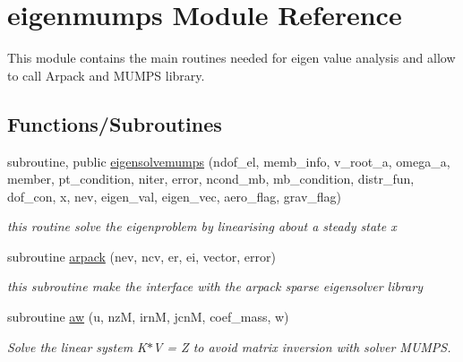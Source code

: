 \hypertarget{namespaceeigenmumps}{}\section{eigenmumps Module Reference}
\label{namespaceeigenmumps}


This module contains the main routines needed for eigen value analysis and allow to call Arpack and M\+U\+M\+PS library.  


\subsection*{Functions/\+Subroutines}
\begin{DoxyCompactItemize}
\item 
subroutine, public \hyperlink{namespaceeigenmumps_ae4a95ffe93412104411a9914edccd507}{eigensolvemumps} (ndof\+\_\+el, memb\+\_\+info, v\+\_\+root\+\_\+a, omega\+\_\+a, member, pt\+\_\+condition, niter, error, ncond\+\_\+mb, mb\+\_\+condition, distr\+\_\+fun, dof\+\_\+con, x, nev, eigen\+\_\+val, eigen\+\_\+vec, aero\+\_\+flag, grav\+\_\+flag)
\begin{DoxyCompactList}\small\item\em this routine solve the eigenproblem by linearising about a steady state x \end{DoxyCompactList}\item 
subroutine \hyperlink{namespaceeigenmumps_a86ca8fa64997377eaafa9b3b69a86d49}{arpack} (nev, ncv, er, ei, vector, error)
\begin{DoxyCompactList}\small\item\em this subroutine make the interface with the arpack sparse eigensolver library \end{DoxyCompactList}\item 
subroutine \hyperlink{namespaceeigenmumps_ac941735ba53914846bfec44d74ad79c6}{aw} (u, nzM, irnM, jcnM, coef\+\_\+mass, w)
\begin{DoxyCompactList}\small\item\em Solve the linear system K$\ast$V = Z to avoid matrix inversion with solver M\+U\+M\+PS. \end{DoxyCompactList}\end{DoxyCompactItemize}
